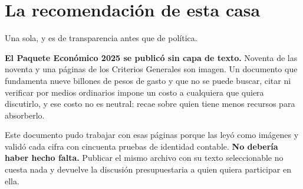 \section{La recomendación de esta casa}

Una sola, y es de transparencia antes que de política.

\textbf{El Paquete Económico 2025 se publicó sin capa de texto.} Noventa de las
noventa y una páginas de los Criterios Generales son imagen. Un documento que
fundamenta nueve billones de pesos de gasto y que no se puede buscar, citar ni
verificar por medios ordinarios impone un costo a cualquiera que quiera
discutirlo, y ese costo no es neutral: recae sobre quien tiene menos recursos para
absorberlo.

Este documento pudo trabajar con esas páginas porque las leyó como imágenes y
validó cada cifra con cincuenta pruebas de identidad contable. \textbf{No debería
haber hecho falta.} Publicar el mismo archivo con su texto seleccionable no cuesta
nada y devuelve la discusión presupuestaria a quien quiera participar en ella.

\clearpage
